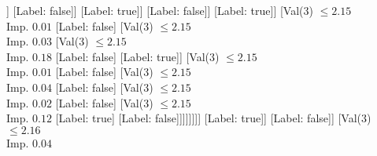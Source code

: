 \documentclass[margin=10pt]{standalone}
\begin{document}
\begin{forest}
																							[Val($3$) $ \leq 2.16$ \\ Imp. $0.01$
																								[Val($3$) $ \leq 2.16$ \\ Imp. $0.01$
																									[Val($3$) $ \leq 2.15$ \\ Imp. $0.01$
																										[Val($3$) $ \leq 2.15$ \\ Imp. $0.02$
																											[Val($3$) $ \leq 2.15$ \\ Imp. $0.00$
																												[Val($3$) $ \leq 2.15$ \\ Imp. $0.07$
																													[Val($3$) $ \leq 2.15$ \\ Imp. $0.02$
																														[Val($3$) $ \leq 2.15$ \\ Imp. $0.13$
																															[Val($3$) $ \leq 2.15$ \\ Imp. $0.03$
																																[Val($3$) $ \leq 2.14$ \\ Imp. $0.38$
																																	[Label: false]
																																	[Label: true]]
																																[Label: false]]
																															[Label: true]]
																														[Label: false]]
																													[Label: true]]
																												[Val($3$) $ \leq 2.15$ \\ Imp. $0.01$
																													[Label: false]
																													[Val($3$) $ \leq 2.15$ \\ Imp. $0.03$
																														[Val($3$) $ \leq 2.15$ \\ Imp. $0.18$
																															[Label: false]
																															[Label: true]]
																														[Val($3$) $ \leq 2.15$ \\ Imp. $0.01$
																															[Label: false]
																															[Val($3$) $ \leq 2.15$ \\ Imp. $0.04$
																																[Label: false]
																																[Val($3$) $ \leq 2.15$ \\ Imp. $0.02$
																																	[Label: false]
																																	[Val($3$) $ \leq 2.15$ \\ Imp. $0.12$
																																		[Label: true]
																																		[Label: false]]]]]]]]
																											[Label: true]]
																										[Label: false]]
																									[Val($3$) $ \leq 2.16$ \\ Imp. $0.04$

\end{forest}
\end{document}
